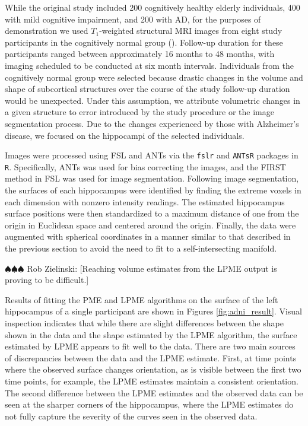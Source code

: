 \documentclass[11pt,reqno]{article}
\newcommand{\zielinski}[1]{{\color{blue} \sf $\spadesuit\spadesuit\spadesuit$ Rob Zielinski: [#1]}}
\theoremstyle{definition}
\begin{document}
While the original study included 200 cognitively healthy elderly individuals, 400 with mild cognitive impairment, and 200 with AD, for the purposes of demonstration we used $T_1$-weighted structural MRI images from eight study participants in the cognitively normal group (\cite{jack2008adni}). Follow-up duration for these participants ranged between approximately 16 months to 48 months, with imaging scheduled to be conducted at six month intervals. Individuals from the cognitively normal group were selected because drastic changes in the volume and shape of subcortical structures over the course of the study follow-up duration would be unexpected. Under this assumption, we attribute volumetric changes in a given structure to error introduced by the study procedure or the image segmentation process. Due to the changes experienced by those with Alzheimer's disease, we focused on the hippocampi of the selected individuals. 

Images were processed using FSL and ANTs via the \texttt{fslr} and \texttt{ANTsR} packages in \texttt{R}. Specifically, ANTs was used for bias correcting the images, and the FIRST method in FSL was used for image segmentation. Following image segmentation, the surfaces of each hippocampus were identified by finding the extreme voxels in each dimension with nonzero intensity readings. The estimated hippocampus surface positions were then standardized to a maximum distance of one from the origin in Euclidean space and centered around the origin. Finally, the data were augmented with spherical coordinates in a manner similar to that described in the previous section to avoid the need to fit to a self-intersecting manifold.

\zielinski{Reaching volume estimates from the LPME output is proving to be difficult.}

Results of fitting the PME and LPME algorithms on the surface of the left hippocampus of a single participant are shown in Figures \ref{fig:adni_result}. Visual inspection indicates that while there are slight differences between the shape shown in the data and the shape estimated by the LPME algorithm, the surface estimated by LPME appears to fit well to the data. There are two main sources of discrepancies between the data and the LPME estimate. First, at time points where the observed surface changes orientation, as is visible between the first two time points, for example, the LPME estimates maintain a consistent orientation. The second difference between the LPME estimates and the observed data can be seen at the sharper corners of the hippocampus, where the LPME estimates do not fully capture the severity of the curves seen in the observed data.
\end{document}
